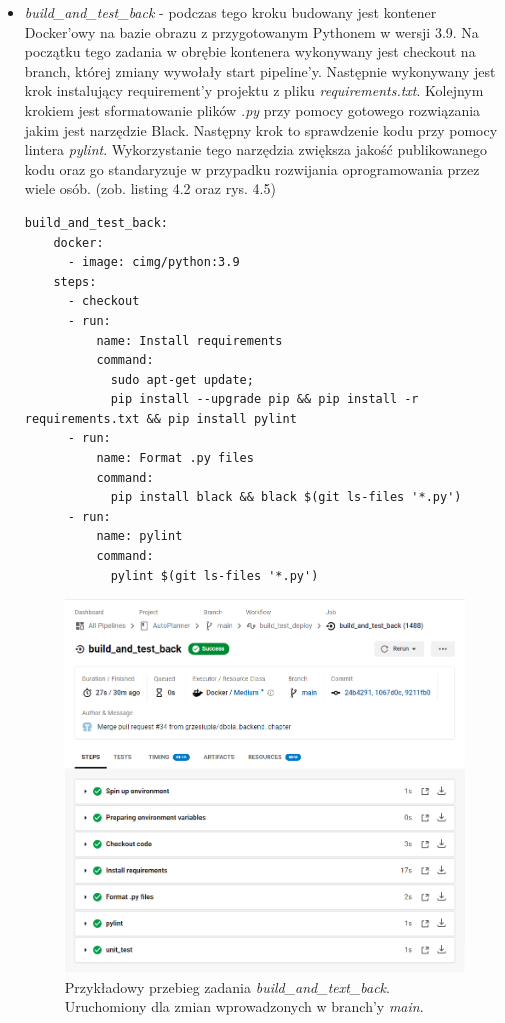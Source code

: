 \begin{itemize}
\newpage
	\item \textit{build\_and\_test\_back} - podczas tego kroku budowany jest kontener Docker'owy na bazie obrazu z przygotowanym Pythonem w wersji 3.9. Na początku tego zadania w obrębie kontenera wykonywany jest checkout na branch, której zmiany wywołały start pipeline'y. Następnie wykonywany jest krok instalujący requirement'y projektu z pliku \textit{requirements.txt}. Kolejnym krokiem jest sformatowanie plików \textit{.py} przy pomocy gotowego rozwiązania jakim jest narzędzie Black. Następny krok to sprawdzenie kodu przy pomocy lintera \textit{pylint}. Wykorzystanie tego narzędzia zwiększa jakość publikowanego kodu oraz go standaryzuje w przypadku rozwijania oprogramowania przez wiele osób. (zob. listing 4.2 oraz rys. 4.5)
	
\begin{lstlisting}[caption=Część skryptu config.yml odpowiadająca za wykonanie zadania \textit{build\_and\_test\_back}.]
build_and_test_back:
    docker:
      - image: cimg/python:3.9
    steps:
      - checkout
      - run:
          name: Install requirements
          command:
            sudo apt-get update;
            pip install --upgrade pip && pip install -r requirements.txt && pip install pylint
      - run:
          name: Format .py files
          command:
            pip install black && black $(git ls-files '*.py')
      - run:
          name: pylint
          command:
            pylint $(git ls-files '*.py')
\end{lstlisting} 
\newpage
\begin{figure}[H]
\centering\includegraphics[width=\textwidth]{figures/circleci_test_back}
\caption{Przykładowy przebieg zadania \textit{build\_and\_text\_back}. Uruchomiony dla zmian wprowadzonych w branch'y \textit{main}.}
\end{figure} 


\end{itemize}
